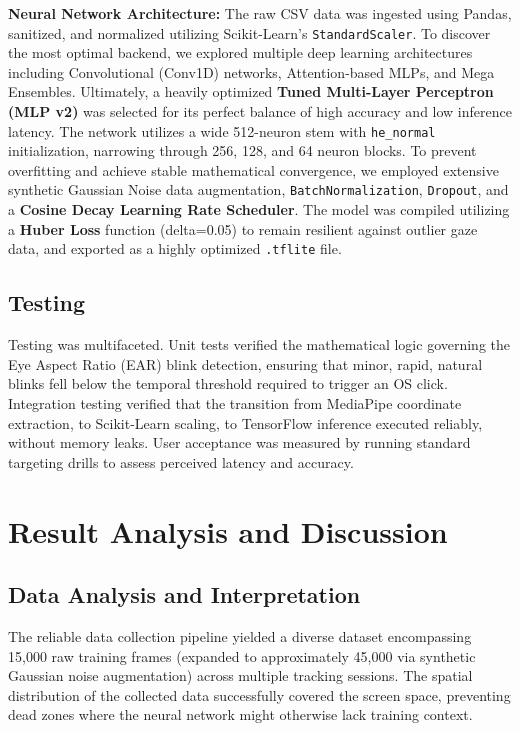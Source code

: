 \documentclass[12pt,a4paper]{report}
\begin{document}
\textbf{Neural Network Architecture:} The raw CSV data was ingested using Pandas, sanitized, and normalized utilizing Scikit-Learn's \texttt{StandardScaler}. To discover the most optimal backend, we explored multiple deep learning architectures including Convolutional (Conv1D) networks, Attention-based MLPs, and Mega Ensembles. Ultimately, a heavily optimized \textbf{Tuned Multi-Layer Perceptron (MLP v2)} was selected for its perfect balance of high accuracy and low inference latency. The network utilizes a wide 512-neuron stem with \texttt{he\_normal} initialization, narrowing through 256, 128, and 64 neuron blocks. To prevent overfitting and achieve stable mathematical convergence, we employed extensive synthetic Gaussian Noise data augmentation, \texttt{BatchNormalization}, \texttt{Dropout}, and a \textbf{Cosine Decay Learning Rate Scheduler}. The model was compiled utilizing a \textbf{Huber Loss} function (delta=0.05) to remain resilient against outlier gaze data, and exported as a highly optimized \texttt{.tflite} file.

\section{Testing}
Testing was multifaceted. Unit tests verified the mathematical logic governing the Eye Aspect Ratio (EAR) blink detection, ensuring that minor, rapid, natural blinks fell below the temporal threshold required to trigger an OS click. Integration testing verified that the transition from MediaPipe coordinate extraction, to Scikit-Learn scaling, to TensorFlow inference executed reliably, without memory leaks. User acceptance was measured by running standard targeting drills to assess perceived latency and accuracy.

\chapter{Result Analysis and Discussion}
\section{Data Analysis and Interpretation}
The reliable data collection pipeline yielded a diverse dataset encompassing 15,000 raw training frames (expanded to approximately 45,000 via synthetic Gaussian noise augmentation)  across multiple tracking sessions. The spatial distribution of the collected data successfully covered the screen space, preventing dead zones where the neural network might otherwise lack training context.
\end{document}
